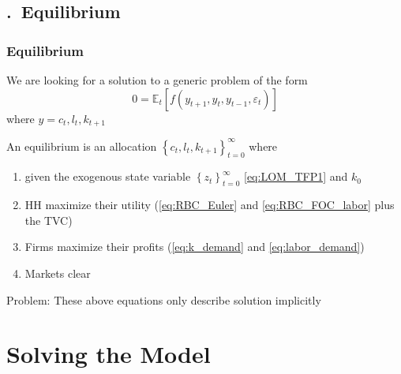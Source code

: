 \documentclass[handout,usepdftitle=false,xcolor=dvipsnames,aspectratio=169]{beamer}
\begin{document}
\subsection{\thesection.\thesubsection \ Equilibrium}
\renewcommand{\Source}{\textcite{Krueger2012}, Ch. 4.5}
\begin{frame}
\frametitle{Equilibrium}
\begin{witemize}
\item We are looking for a solution to a generic problem of the form
\begin{equation}
  0=\mathbb{E}_t[f({y_{t+1}},y_t,y_{t-1},\varepsilon_t)]
\end{equation}
where $y={c_t,l_t,k_{t+1}}$
\item An equilibrium is an allocation $\left\{c_t,l_t,k_{t+1} \right\}_{t=0}^{\infty}$ where
\begin{enumerate}
\item given the exogenous state variable $\left\{z_t \right\}_{t=0}^{\infty}$ \eqref{eq:LOM_TFP1} and $k_0$
\item HH maximize their utility (\eqref{eq:RBC_Euler} and \eqref{eq:RBC_FOC_labor} plus the TVC)
\item Firms maximize their profits (\eqref{eq:k_demand} and \eqref{eq:labor_demand})
\item Markets clear
\end{enumerate}
\item Problem: These above equations only describe solution implicitly
\end{witemize}
\end{frame}


\section{Solving the Model}
\end{document}
